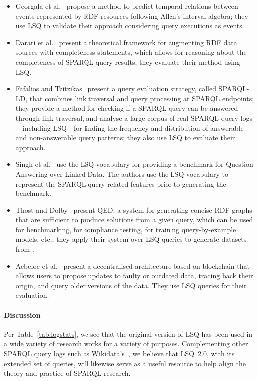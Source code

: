 \begin{itemize}
\item Georgala et al.~\cite{georgala2016efficient} propose a method to predict temporal relations between events represented by RDF resources following Allen's interval algebra; they use LSQ to validate their approach considering query executions as events.  
\item Darari et al.~\cite{darari2018completeness} present a theoretical framework for augmenting RDF data sources with completeness statements, which allows for reasoning about the completeness of SPARQL query results; they evaluate their method using LSQ.
\item Fafalios and Tzitzikas~\cite{fafalios2019many} present a query evaluation strategy, called SPARQL-LD, that combines link traversal and query processing at SPARQL endpoints; they provide a method for checking if a SPARQL query can be answered through link traversal, and analyse a large corpus of real SPARQL query logs---including LSQ---for finding the frequency and distribution of answerable and non-answerable query patterns; they also use LSQ to evaluate their approach.
\item Singh et al.~\cite{singh2019qaldgen} use the LSQ vocabulary for providing a benchmark for Question Answering over Linked Data. The authors use the LSQ vocabulary to represent the SPARQL query related features prior to generating the benchmark. 
\item Thost and Dolby~\cite{thost2019qed} present QED: a system for generating concise RDF graphs that are sufficient to produce solutions from a given query, which can be used for benchmarking, for compliance testing, for training query-by-example models, etc.; they apply their system over LSQ queries to generate datasets from \dbpedia. 
\item Aebeloe et al.~\cite{AebeloeMH21} present a decentralised architecture based on blockchain that allows users to propose updates to faulty or outdated data, tracing back their origin, and query older versions of the data. They use LSQ queries for their evaluation. 
\end{itemize}

\paragraph{Discussion} Per Table~\ref{tab:logstats}, we see that the original version of LSQ has been used in a wide variety of research works for a variety of purposes. Complementing other SPARQL query logs such as Wikidata's~\cite{MalyshevKGGB18}, we believe that LSQ~2.0, with its extended set of queries, will likewise serve as a useful resource to help align the theory and practice of SPARQL research.

